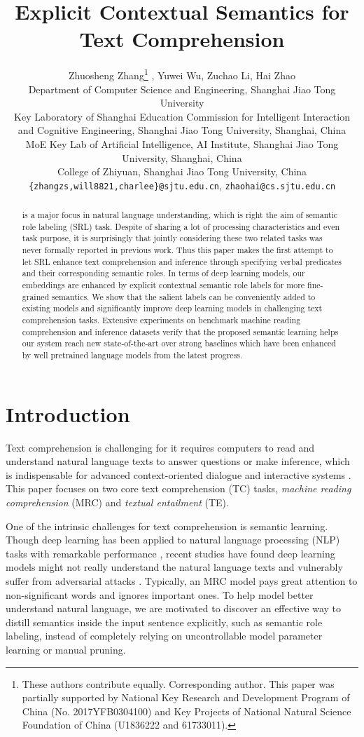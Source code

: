 \documentclass[11pt]{article}
\title{Explicit Contextual Semantics for Text Comprehension}
\author{
	Zhuosheng Zhang\thanks{ These authors contribute equally.  Corresponding author. This paper was partially supported by National Key Research and Development Program of China (No. 2017YFB0304100) and Key Projects of National Natural Science Foundation of China (U1836222 and 61733011).}  ,
	Yuwei Wu,
	Zuchao Li,
	Hai Zhao
	\\
	Department of Computer Science and Engineering, Shanghai Jiao Tong University\\
	Key Laboratory of Shanghai Education Commission for Intelligent Interaction\\
	and Cognitive Engineering, Shanghai Jiao Tong University, Shanghai, China\\
	MoE Key Lab of Artificial Intelligence, AI Institute, Shanghai Jiao Tong University, Shanghai, China\\
	College of Zhiyuan, Shanghai Jiao Tong University, China\\
	{\tt\{zhangzs,will8821,charlee\}@sjtu.edu.cn},
	{\tt zhaohai@cs.sjtu.edu.cn}
}
\date{}
\begin{document}
\maketitle
\begin{abstract}
   is a major focus in natural language understanding, which is right the aim of semantic role labeling (SRL) task. Despite of sharing a lot of processing characteristics and even task purpose, it is surprisingly that jointly considering these two related tasks was never formally reported in previous work. Thus this paper makes the first attempt to let SRL enhance text comprehension and inference through specifying verbal predicates and their corresponding semantic roles. In terms of deep learning models, our embeddings are enhanced by explicit contextual semantic role labels for more fine-grained semantics. We show that the salient labels can be conveniently added to existing models and significantly improve deep learning models in challenging text comprehension tasks. Extensive experiments on benchmark machine reading comprehension and inference datasets verify that the proposed semantic learning helps our system reach new state-of-the-art over strong baselines which have been enhanced by well pretrained language models from the latest progress.
\end{abstract}

\section{Introduction}

Text comprehension is challenging for it requires computers to read and understand natural language texts to answer questions or make inference, which is indispensable for advanced context-oriented dialogue \citep{zhang2018DUA,Zhu2018lingke} and interactive systems \citep{chen2015neural,Huang2018Moon,zhang2019ime}. This paper focuses on two core text comprehension (TC) tasks, \emph{machine reading comprehension} (MRC) and \emph{textual entailment} (TE). 

One of the intrinsic challenges for text comprehension is semantic learning. Though deep learning has been applied to natural language processing (NLP) tasks with remarkable performance \citep{Cai2017Fast,zhang2018exploring,zhang2018OneShot,Bai2018deep,Zhang2018Effective,xiao-etal-2019-lattice}, recent studies have found deep learning models might not really understand the natural language texts \citep{Mudrakarta2018Did} and vulnerably suffer from adversarial attacks \citep{Jia2017Adversarial}. Typically, an MRC model pays great attention to non-significant words and ignores important ones. To help model better understand natural language, we are motivated to discover an effective way to distill semantics inside the input sentence explicitly, such as semantic role labeling, instead of completely relying on uncontrollable model parameter learning or manual pruning.
\end{document}
